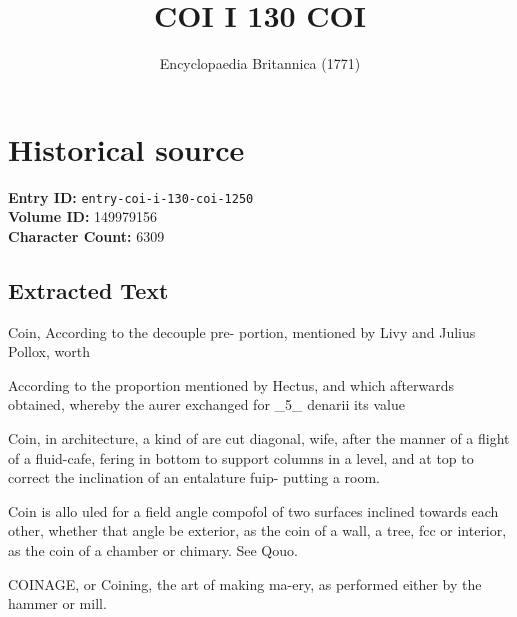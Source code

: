 \documentclass{article}
\title{COI I 130  COI}
\date{Encyclopaedia Britannica (1771)}
\begin{document}
\maketitle

\section*{Historical source}
\textbf{Entry ID:} \texttt{entry-coi-i-130-coi-1250} \\
\textbf{Volume ID:} 149979156 \\
\textbf{Character Count:} 6309

\subsection*{Extracted Text}
Coin,
According to the decouple pre-
portion, mentioned by Livy and Julius Pollox, worth

According to the proportion mentioned by Hectus, and which afterwards obtained, whereby the aurer exchanged for \_5\_ denarii its value

Coin, in architecture, a kind of are cut diagonal, wife, after the manner of a flight of a fluid-cafe, fering in bottom to support columns in a level, and at top to correct the inclination of an entalature fuip- putting a room.

Coin is allo uled for a field angle compofol of two surfaces inclined towards each other, whether that angle be exterior, as the coin of a wall, a tree, fcc or interior, as the coin of a chamber or chimary. See Qouo.

COINAGE, or Coining, the art of making ma-ery, as performed either by the hammer or mill.
\end{document}
